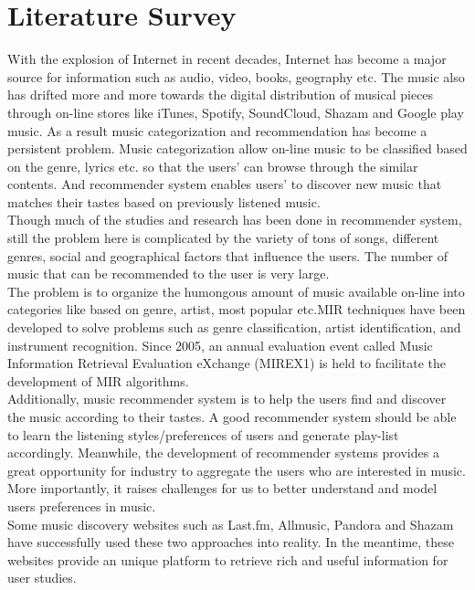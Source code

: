 \documentclass{sig-alternate-05-2015}
\begin{document}
\section{Literature Survey}
With the explosion of Internet in recent decades, Internet has become a major source for information such as audio, video, books, geography etc. The music also has drifted more and more towards the digital distribution of musical pieces through on-line stores like iTunes, Spotify, SoundCloud, Shazam and Google play music. As a result music categorization and recommendation has become a persistent problem. Music categorization allow on-line music to be classified based on the genre, lyrics etc. so that the users' can browse through the similar contents. And recommender system enables users' to discover new music that matches their tastes based on previously listened music.\\

Though much of the studies and research has been done in recommender system, still the problem here is complicated by the variety of tons of songs, different genres, social and geographical factors that influence the users. The number of music that can be recommended to the user is very large.\\

The problem is to organize the humongous amount of music available on-line into categories like based on genre, artist, most popular etc.MIR  techniques  have  been  developed  to  solve problems  such  as  genre  classification,  artist  identification,  and  instrument recognition. Since 2005, an annual evaluation event called Music Information Retrieval Evaluation eXchange (MIREX1) is held to facilitate the development of MIR algorithms\cite{DeepContentbased}.\\

Additionally, music recommender system is to help the users find and discover the music according to their tastes. A good recommender system should be able to learn the listening styles/preferences of users and generate play-list accordingly. Meanwhile, the development of recommender systems provides a great opportunity for industry  to  aggregate  the  users  who  are  interested  in  music.  More  importantly, it raises challenges for us to better understand and model users preferences in music.\\

Some music discovery websites such as Last.fm, Allmusic, Pandora and Shazam have successfully used these two approaches into reality. In the meantime, these websites provide an unique platform to retrieve rich and useful information for user studies.\\
\end{document}
